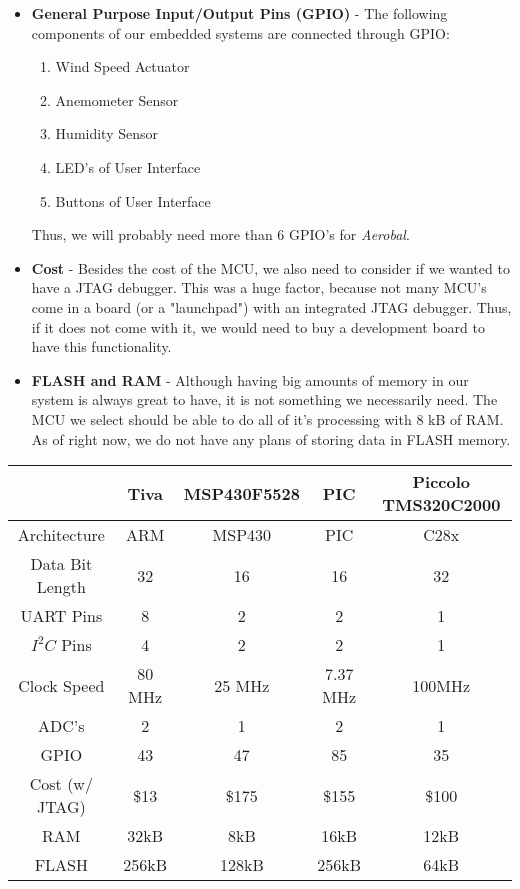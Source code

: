 \begin{itemize}
  	\item \textbf{General Purpose Input/Output Pins (GPIO)} - The following components of our embedded systems are connected through GPIO: 
  	\begin{enumerate}  	
  	\item Wind Speed Actuator
  	\item Anemometer Sensor
  	\item Humidity Sensor
  	\item LED's of User Interface
  	\item Buttons of User Interface

  	\end{enumerate}
  	
  	Thus, we will probably need more than 6 GPIO's for \textit{Aerobal}. 
  	
	\item \textbf{Cost} - Besides the cost of the MCU, we also need to consider if we wanted to have a JTAG debugger. This was a huge factor, because not many MCU's come in a board (or a "launchpad") with an integrated JTAG debugger. Thus, if it does not come with it, we would need to buy a development board to have this functionality. 
	
	\item \textbf{FLASH and RAM} - Although having big amounts of memory in our system is always great to have, it is not something we necessarily need. The MCU we select should be able to do all of it's processing with 8 kB of RAM. As of right now, we do not have any plans of storing data in FLASH memory. 
	
\end{itemize}		
	
	
\begin{tabular}{|c|c|c|c|c|}
\hline
& Tiva & MSP430F5528 & PIC & Piccolo TMS320C2000 \\
\hline
Architecture & ARM & MSP430 & PIC & C28x \\ 
Data Bit Length & 32 & 16 & 16 & 32\\ 
UART Pins & 8 & 2 & 2 & 1 \\ 
$I^2C$ Pins & 4 & 2 & 2 & 1 \\ 
Clock Speed & 80 MHz & 25 MHz & 7.37 MHz & 100MHz \\ 
ADC's & 2 & 1 & 2 & 1\\ 
GPIO & 43 & 47 & 85 & 35 \\ 
Cost (w/ JTAG) & \$13 & \$175 & \$155 & \$100 \\ 
RAM & 32kB & 8kB & 16kB & 12kB \\ 
FLASH & 256kB & 128kB & 256kB & 64kB \\ 


\hline
\end{tabular} \\ \\

